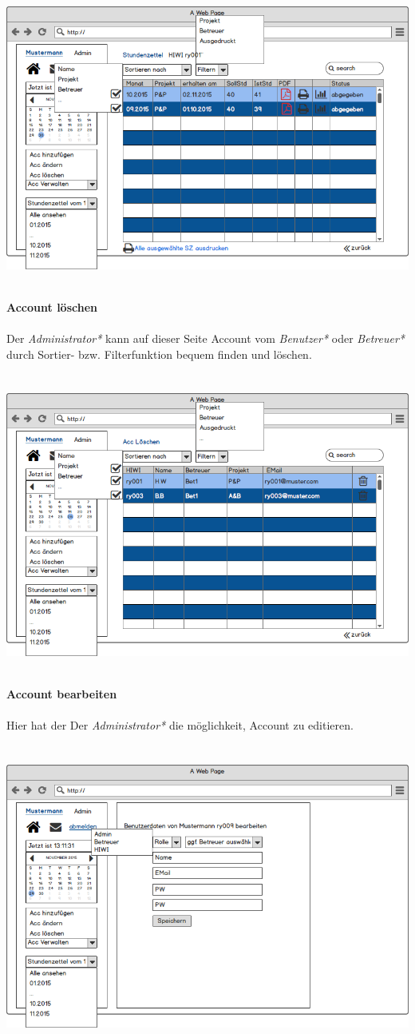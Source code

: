 \includegraphics[width=\linewidth]{UI/Admin/EinBenutzer.png}

\newpage
\textbf{\\Account löschen}\\
\\
Der \emph{Administrator*} kann auf dieser Seite Account vom \emph{Benutzer*} oder \emph{Betreuer*} durch Sortier- bzw. Filterfunktion bequem finden und löschen.\\
\\
\\
\includegraphics[width=\linewidth]{UI/Admin/Accounts/Ubersicht.png}



\newpage
\textbf{\\Account bearbeiten}\\
\\
Hier hat der Der \emph{Administrator*} die möglichkeit, Account zu editieren.\\
\\
\\
\includegraphics[width=\linewidth]{UI/Admin/Accounts/Bearbeiten.png}
